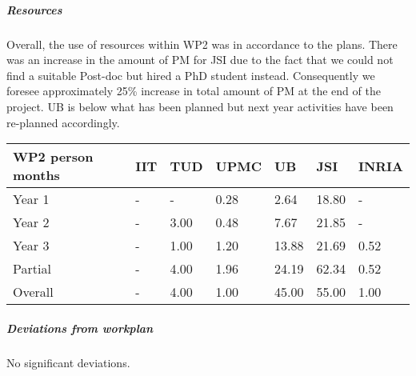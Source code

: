 
\subparagraph*{Resources}
Overall, the use of resources within WP2 was in accordance to the plans. There was an increase in the amount of PM for JSI due to the fact that we could not find a suitable Post-doc but hired a PhD student instead. Consequently we foresee approximately 25\% increase in total amount of PM at the end of the project. UB is below what has been planned but next year activities have been re-planned accordingly. 

\begin{center}
\begin{tabular}{|C{1.5cm}|C{1.5cm}|C{1.5cm}|C{2cm}|C{2cm}|C{2cm}|C{2cm}|}
\hline
\footnotesize \textbf{WP2 person months}& \footnotesize \textbf{IIT}&\footnotesize \textbf{TUD}&\footnotesize \textbf{UPMC}& \footnotesize \textbf{UB} &\footnotesize \textbf{JSI} & \footnotesize \textbf{INRIA} \\ \hline
\footnotesize Year 1  &  -     & -    & 0.28 & 2.64  & 18.80  & -  \\  \hline
\footnotesize Year 2  &  -     & 3.00 & 0.48 & 7.67  & 21.85  & -  \\  \hline
\footnotesize Year 3  &  -     & 1.00 & 1.20 & 13.88 & 21.69  & 0.52  \\ \hline
\footnotesize Partial &  -     & 4.00 & 1.96 & 24.19 & 62.34  & 0.52 \\
\hline \hline
\footnotesize Overall & -     & 4.00 & 1.00 & 45.00 & 55.00 & 1.00 \\ \hline
\end{tabular}
\end{center}

\subparagraph*{Deviations from workplan} 
No significant deviations.

